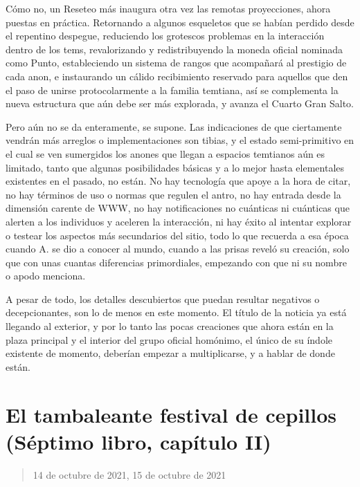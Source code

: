 \documentclass[
]{book}
\begin{document}
Cómo no, un Reseteo más inaugura otra vez las remotas proyecciones, ahora puestas en práctica. Retornando a algunos esqueletos que se habían perdido desde el repentino despegue, reduciendo los grotescos problemas en la interacción dentro de los tems, revalorizando y redistribuyendo la moneda oficial nominada como Punto, estableciendo un sistema de rangos que acompañará al prestigio de cada anon, e instaurando un cálido recibimiento reservado para aquellos que den el paso de unirse protocolarmente a la familia temtiana, así se complementa la nueva estructura que aún debe ser más explorada, y avanza el Cuarto Gran Salto.

Pero aún no se da enteramente, se supone. Las indicaciones de que ciertamente vendrán más arreglos o implementaciones son tibias, y el estado semi-primitivo en el cual se ven sumergidos los anones que llegan a espacios temtianos aún es limitado, tanto que algunas posibilidades básicas y a lo mejor hasta elementales existentes en el pasado, no están. No hay tecnología que apoye a la hora de citar, no hay términos de uso o normas que regulen el antro, no hay entrada desde la dimensión carente de WWW, no hay notificaciones no cuánticas ni cuánticas que alerten a los individuos y aceleren la interacción, ni hay éxito al intentar explorar o testear los aspectos más secundarios del sitio, todo lo que recuerda a esa época cuando A. se dio a conocer al mundo, cuando a las prisas reveló su creación, solo que con unas cuantas diferencias primordiales, empezando con que ni su nombre o apodo menciona.

A pesar de todo, los detalles descubiertos que puedan resultar negativos o decepcionantes, son lo de menos en este momento. El título de la noticia ya está llegando al exterior, y por lo tanto las pocas creaciones que ahora están en la plaza principal y el interior del grupo oficial homónimo, el único de su índole existente de momento, deberían empezar a multiplicarse, y a hablar de donde están.

\hypertarget{el-tambaleante-festival-de-cepillos-suxe9ptimo-libro-capuxedtulo-ii}{%
\section{El tambaleante festival de cepillos (Séptimo libro, capítulo II)}\label{el-tambaleante-festival-de-cepillos-suxe9ptimo-libro-capuxedtulo-ii}}

\begin{quote}
14 de octubre de 2021, 15 de octubre de 2021
\end{quote}
\end{document}
